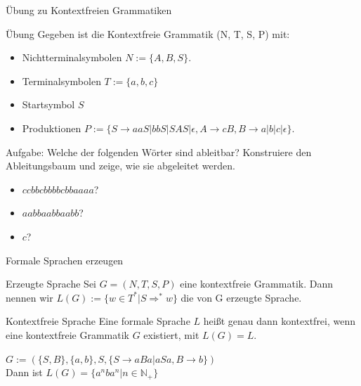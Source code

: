 \documentclass[]{beamer}
\begin{document}
\begin{frame}{Übung zu Kontextfreien Grammatiken}
	\begin{taskblock}{Übung}
		Gegeben ist die Kontextfreie Grammatik (N, T, S, P) mit:
		
		\begin{itemize}
			\item Nichtterminalsymbolen $N := \{A, B, S\}$.
			\item Terminalsymbolen $T := \{a, b, c\}$
			\item Startsymbol $S$
			\item Produktionen $P := \{S \rightarrow aaS | bbS | SAS | \epsilon, A \rightarrow cB , B \rightarrow a | b| c | \epsilon\}$.
		\end{itemize}
	
		\bp
	
		Aufgabe: Welche der folgenden Wörter sind ableitbar? Konstruiere den Ableitungsbaum und zeige, wie sie abgeleitet werden.
		
		\begin{itemize}
			\item $ccbbcbbbbcbbaaaa$? %
			\item $aabbaabbaabb$? %
			\item $c$?
		\end{itemize}
	\end{taskblock}
\end{frame}

\begin{frame}{Formale Sprachen erzeugen}
	\begin{block}{Erzeugte Sprache}
		Sei $G = (N, T, S, P)$ eine kontextfreie Grammatik. Dann nennen wir $L(G) := \{w \in T^*| S \Rightarrow^* w\}$ die von G erzeugte Sprache.
	\end{block}

	\bp
	
	\begin{block}{Kontextfreie Sprache}
		Eine formale Sprache $L$ heißt genau dann kontextfrei, wenn eine kontextfreie Grammatik $G$ existiert, mit $L(G) = L$.
	\end{block}

	\bp

	$G:= (\{S,B\}, \{a,b\}, S, \{S \rightarrow aBa|aSa, B \rightarrow b\})$\\\vspace{.3cm}
	\ip Dann ist $L(G) = \{a^nba^n|n \in \mathbb{N_+}\}$
\end{frame}
\end{document}
